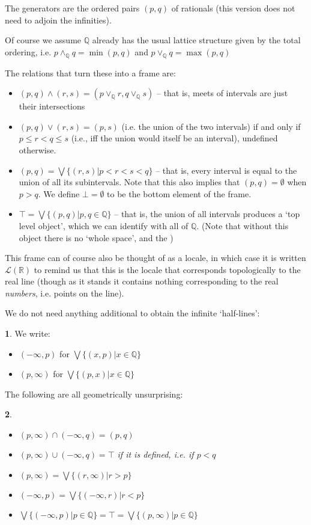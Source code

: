 \documentclass[oneside,english]{amsbook}
\numberwithin{section}{chapter}
\theoremstyle{plain}
\newtheorem{thm}{\protect\theoremname}
\theoremstyle{definition}
\newtheorem{defn}[thm]{\protect\definitionname}
\providecommand{\definitionname}{Definition}
\providecommand{\theoremname}{Theorem}
\begin{document}
The generators are the ordered pairs $(p, q)$ of rationals (this version does not need to adjoin the infinities). 

Of course we assume $\mathbb{Q}$ already has the usual lattice structure given by the total ordering, i.e. $p\land_\mathbb{Q} q = \min(p, q)$ and $p\lor_\mathbb{Q} q = \max(p, q)$

The relations that turn these into a frame are:
\begin{itemize}
	\item{$(p, q)\land(r, s) = (p\lor_\mathbb{Q} r, q\lor_\mathbb{Q} s)$ -- that is, meets of intervals are just their intersections}
	\item{$(p, q)\lor(r, s) = (p, s)$ (i.e. the union of the two intervals) if and only if $p\le r < q\le s$ (i.e., iff the union would itself be an interval), undefined otherwise.}
	\item{$(p, q) = \bigvee \{(r,s)|p<r<s<q\}$ -- that is, every interval is equal to the union of all its subintervals. Note that this also implies that $(p, q)=\emptyset$ when $p>q$. We define $\bot = \emptyset$ to be the bottom element of the frame.}
	\item{$\top = \bigvee \{(p, q)|p, q\in \mathbb{Q}\}$ -- that is, the union of all intervals produces a `top level object', which we can identify with all of $\mathbb{Q}$. (Note that without this object there is no `whole space', and the )}
\end{itemize}

This frame can of course also be thought of as a locale, in which case it is written $\mathscr{L}(\mathbb{R})$ to remind us that this is the locale that corresponds topologically to the real line (though as it stands it contains nothing corresponding to the real \emph{numbers}, i.e. points on the line). 

We do not need anything additional to obtain the infinite `half-lines':
\begin{defn}
	We write:
	\begin{itemize}
		\item{$(-\infty, p)$ for $\bigvee \{(x, p)|x\in \mathbb{Q}\}$}
		\item{$(p, \infty)$ for $\bigvee \{(p, x)|x\in \mathbb{Q}\}$}
	\end{itemize}
\end{defn}

The following are all geometrically unsurprising:

\begin{thm}
	\begin{itemize}
		\item{$(p, \infty)\cap (-\infty, q) = (p, q)$}
		\item{$(p, \infty)\cup (-\infty, q) = \top$ if it is defined, i.e. if $p<q$}
		\item{$(p, \infty)= \bigvee \{(r, \infty)|r > p\}$}
		\item{$(-\infty, p)= \bigvee \{(-\infty, r)|r < p\}$}
		\item{$\bigvee \{(-\infty, p)| p\in \mathbb{Q}\} = \top = \bigvee \{(p, \infty)| p\in \mathbb{Q}\}$}
	\end{itemize}
\end{thm}
\end{document}
